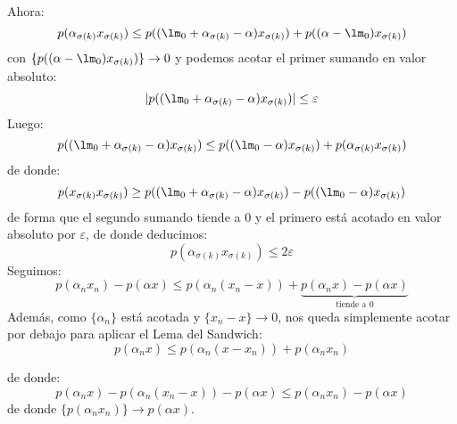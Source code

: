 \begin{ejercicio}
\begin{equation*}
    \end{equation*}
    Ahora:
    \begin{equation*}
        p(\alpha_{\sigma(k)}x_{\sigma(k)})\leq p((\lm_0+\alpha_{\sigma(k)}-\alpha)x_{\sigma(k)}) + p((\alpha-\lm_0)x_{\sigma(k)})
    \end{equation*}
    con $\{ p((\alpha-\lm_0)x_{\sigma(k)})\}\to 0$ y podemos acotar el primer sumando en valor absoluto:
    \begin{equation*}
        |p((\lm_0+\alpha_{\sigma(k)}-\alpha)x_{\sigma(k)}) |\leq \varepsilon
    \end{equation*}
    Luego:
    \begin{equation*}
        p((\lm_0 + \alpha_{\sigma(k)} - \alpha)x_{\sigma(k)}) \leq p((\lm_0-\alpha)x_{\sigma(k)}) + p(\alpha_{\sigma(k)}x_{\sigma(k)})
    \end{equation*}
    de donde:
    \begin{equation*}
        p(x_{\sigma(k)}x_{\sigma(k)}) \geq p((\lm_0 + \alpha_{\sigma(k)}-\alpha)x_{\sigma(k)}) - p((\lm_0-\alpha)x_{\sigma(k)})
    \end{equation*}
    de forma que el segundo sumando tiende a 0 y el primero está acotado en valor absoluto por $\varepsilon$, de donde deducimos:
    \begin{equation*}
        p(\alpha_{\sigma(k)}x_{\sigma(k)}) \leq 2\varepsilon
    \end{equation*}
    Seguimos:
    \begin{equation*}
        p(\alpha_n x_n) - p(\alpha x) \leq p(\alpha_n (x_n - x)) + \underbrace{p(\alpha_n x) - p(\alpha  x)}_{\text{tiende a\ } 0}
    \end{equation*}
    Además, como $\{\alpha_n\}$ está acotada y $\{x_n - x\}\to 0$, nos queda simplemente acotar por debajo para aplicar el Lema del Sandwich:
    \begin{equation*}
        p(\alpha_n x) \leq p(\alpha_n (x-x_n)) + p(\alpha_n x_n)
    \end{equation*}

    de donde:
    \begin{equation*}
        p(\alpha_n x) - p(\alpha_n(x_n - x)) - p(\alpha x) \leq p(\alpha_n x_n) - p(\alpha x)
    \end{equation*}
    de donde $\{p(\alpha_n x_n)\}\to p(\alpha x)$.
\end{ejercicio}

